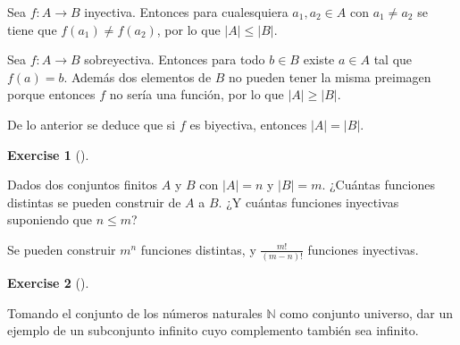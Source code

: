\documentclass[
  letterpaper,
  DIV=11,
  numbers=noendperiod]{scrreport}
\theoremstyle{definition}
\newtheorem{exercise}{Exercise}[chapter]
\theoremstyle{remark}
\begin{document}
\begin{tcolorbox}[enhanced jigsaw, bottomtitle=1mm, opacityback=0, coltitle=black, toprule=.15mm, colback=white, titlerule=0mm, rightrule=.15mm, title=\textcolor{quarto-callout-tip-color}{\faLightbulb}\hspace{0.5em}{Solución}, breakable, bottomrule=.15mm, colbacktitle=quarto-callout-tip-color!10!white, toptitle=1mm, opacitybacktitle=0.6, left=2mm, leftrule=.75mm, colframe=quarto-callout-tip-color-frame, arc=.35mm]
Sea \(f:A\rightarrow B\) inyectiva. Entonces para cualesquiera
\(a_1,a_2\in A\) con \(a_1\neq a_2\) se tiene que \(f(a_1)\neq f(a_2)\),
por lo que \(|A|\leq |B|\).

Sea \(f:A\rightarrow B\) sobreyectiva. Entonces para todo \(b\in B\)
existe \(a\in A\) tal que \(f(a)=b\). Además dos elementos de \(B\) no
pueden tener la misma preimagen porque entonces \(f\) no sería una
función, por lo que \(|A|\geq |B|\).

De lo anterior se deduce que si \(f\) es biyectiva, entonces
\(|A|=|B|\).
\end{tcolorbox}

\leavevmode{}%
\begin{exercise}[]\label{exr-13}

Dados dos conjuntos finitos \(A\) y \(B\) con \(|A|=n\) y \(|B|=m\).
¿Cuántas funciones distintas se pueden construir de \(A\) a \(B\). ¿Y
cuántas funciones inyectivas suponiendo que \(n\leq m\)?

\end{exercise}

\begin{tcolorbox}[enhanced jigsaw, bottomtitle=1mm, opacityback=0, coltitle=black, toprule=.15mm, colback=white, titlerule=0mm, rightrule=.15mm, title=\textcolor{quarto-callout-tip-color}{\faLightbulb}\hspace{0.5em}{Solución}, breakable, bottomrule=.15mm, colbacktitle=quarto-callout-tip-color!10!white, toptitle=1mm, opacitybacktitle=0.6, left=2mm, leftrule=.75mm, colframe=quarto-callout-tip-color-frame, arc=.35mm]
Se pueden construir \(m^n\) funciones distintas, y \(\frac{m!}{(m-n)!}\)
funciones inyectivas.
\end{tcolorbox}

\leavevmode{}%
\begin{exercise}[]\label{exr-14}

Tomando el conjunto de los números naturales \(\mathbb{N}\) como
conjunto universo, dar un ejemplo de un subconjunto infinito cuyo
complemento también sea infinito.

\end{exercise}
\end{document}
